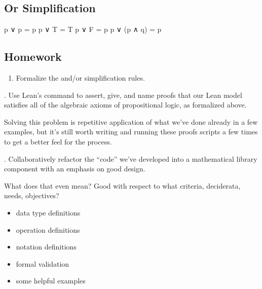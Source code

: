 \documentclass[letterpaper,10pt,english]{sphinxmanual}
\begin{document}
\subsection{Or Simplification}
\label{\detokenize{A_01_Propositional_Logic:or-simplification}}
\sphinxAtStartPar
p ∨ p = p
p ∨ T = T
p ∨ F = p
p ∨ (p ∧ q) = p

\begin{sphinxVerbatim}[commandchars=\\\{\}]
 
 
\end{sphinxVerbatim}


\subsection{Homework}
\label{\detokenize{A_01_Propositional_Logic:homework}}\begin{enumerate}
%
\item {} 
\sphinxAtStartPar
Formalize the and/or simplification rules.

\end{enumerate}

. Use Lean’s  command to assert,
give, and name proofs that our Lean model
satisfies all of the algebraic axioms of
propositional logic, as formalized above.

\sphinxAtStartPar
Solving this problem is repetitive application
of what we’ve done already in a few examples,
but it’s still worth writing and running these
proofs scripts a few times to get a better feel
for the process.

. Collaboratively refactor the “code” we’ve
developed into a mathematical library component
with an emphasis on good design.

\sphinxAtStartPar
What does that even mean? Good with respect to
what criteria, deciderata, needs, objectives?
\begin{itemize}
\item {} 
\sphinxAtStartPar
data type definitions

\item {} 
\sphinxAtStartPar
operation definitions

\item {} 
\sphinxAtStartPar
notation definitions

\item {} 
\sphinxAtStartPar
formal validation

\item {} 
\sphinxAtStartPar
some helpful examples

\end{itemize}
\end{document}
